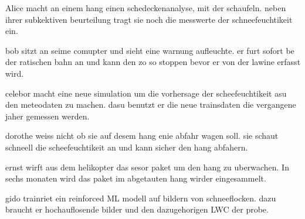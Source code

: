 \label{userstoryvoll}

Alice macht an einem hang einen schedeckenanalyse, mit der schaufeln. neben ihrer subkektiven beurteilung tragt sie noch die messwerte der schneefeuchtikeit ein.

bob sitzt an seime comupter und sieht eine warnung aufleuchte. er furt sofort be der ratischen bahn an und kann den zo so stoppen bevor er von der lawine erfasst wird.

celebor macht eine neue simulation um die vorhersage der scheefeuchtikeit asu den meteodaten zu machen. dasu benutzt er die neue trainsdaten die vergangene jaher gemessen werden.

dorothe weiss nicht ob sie auf desem hang enie abfahr wagen soll. sie schaut schneell die scheefeuchtikeit an und kann sicher den hang abfahern.

ernst wirft aus dem helikopter das sesor paket um den hang zu uberwachen. In sechs monaten wird das paket im abgetauten hang wirder eingesammelt.

gido trainriet ein reinforced ML modell auf bildern von schneeflocken. dazu braucht er hochauflosende bilder und den dazugehorigen LWC der probe.
